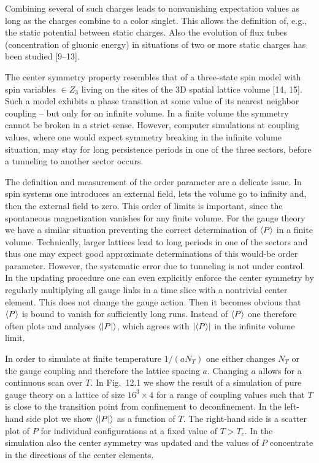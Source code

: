 Combining several of such charges leads to nonvanishing expectation values as
long as the charges combine to a color singlet. This allows the definition of,
e.g., the static potential between static charges. Also the evolution of flux
tubes (concentration of gluonic energy) in situations of two or more static
charges has been studied [9--13].

The center symmetry property resembles that of a three-state spin model with
spin variables $\in Z_3$ living on the sites of the 3D spatial lattice volume
[14, 15]. Such a model exhibits a phase transition at some value of its nearest
neighbor coupling -- but only for an infinite volume. In a finite volume the
symmetry cannot be broken in a strict sense. However, computer simulations at
coupling values, where one would expect symmetry breaking in the infinite
volume situation, may stay for long persistence periods in one of the three
sectors, before a tunneling to another sector occurs.

The definition and measurement of the order parameter are a delicate issue. In
spin systems one introduces an external field, lets the volume go to infinity
and, then the external field to zero. This order of limits is important, since
the spontaneous magnetization vanishes for any finite volume. For the gauge
theory we have a similar situation preventing the correct determination of
$\left\langle P \right\rangle$ in a finite volume. Technically, larger lattices lead to long periods
in one of the sectors and thus one may expect good approximate determinations
of this would-be order parameter. However, the systematic error due to
tunneling is not under control. In the updating procedure one can even
explicitly enforce the center symmetry by regularly multiplying all gauge links
in a time slice with a nontrivial center element. This does not change the
gauge action. Then it becomes obvious that $\left\langle P \right\rangle$ is bound to vanish for
sufficiently long runs. Instead of $\left\langle P \right\rangle$ one therefore often plots and
analyses $\left\langle |P| \right\rangle$, which agrees with $\left|\left\langle P \right\rangle\right|$ in the infinite
volume limit.

In order to simulate at finite temperature $1/(aN_T)$ one either changes $N_T$
or the gauge coupling and therefore the lattice spacing $a$. Changing $a$
allows for a continuous scan over $T$. In Fig.~12.1 we show the result of a
simulation of pure gauge theory on a lattice of size $16^3\times 4$ for a range
of coupling values such that $T$ is close to the transition point from
confinement to deconfinement. In the left-hand side plot we show $\left\langle |P| \right\rangle$ as
a function of $T$. The right-hand side is a scatter plot of $P$ for individual
configurations at a fixed value of $T > T_c$. In the simulation also the center
symmetry was updated and the values of $P$ concentrate in the directions of the
center elements.

